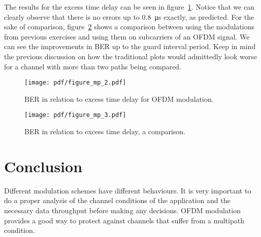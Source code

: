 The results for the excess time delay can be seen in figure~\ref{fig:delayofdm}.
Notice that we can clearly observe that there is no errors up to
\SI{0.8}{\micro\second} exactly, as predicted. For the sake of comparison,
figure~\ref{fig:delaycomp} shows a comparison between using the modulations from
previous exercises and using them on subcarriers of an OFDM signal. We can see the
improvements in BER up to the guard interval period. Keep in mind the previous
discussion on how the traditional plots would admittedly look worse for a channel
with more than two paths being compared.
\begin{figure}
    \centering
    \texttt{[image: pdf/figure\_mp\_2.pdf]}
    \caption{BER in relation to excess time delay for OFDM modulation.
        \label{fig:delayofdm}}
\end{figure}
\begin{figure}
    \centering
    \texttt{[image: pdf/figure\_mp\_3.pdf]}
    \caption{BER in relation to excess time delay, a comparison.
        \label{fig:delaycomp}}
\end{figure}

\section{Conclusion}

Different modulation schemes have different behaviours. It is very important to do
a proper analysis of the channel conditions of the application and the necessary
data throughput before making any decisions. OFDM modulation provides a good way
to protect against channels that suffer from a multipath condition.
